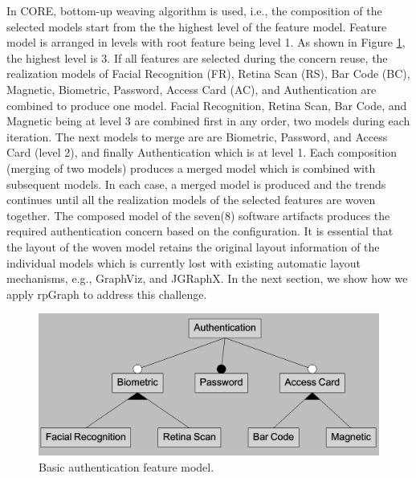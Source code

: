 In CORE, bottom-up weaving algorithm is used, i.e., the composition of the selected models start from the the highest level of the feature model. Feature model is arranged in levels with root feature being level 1. As shown in Figure \ref{fig : authentication fm}, the highest level is 3. If all features are selected during the concern reuse, the realization models of Facial Recognition (FR), Retina Scan (RS), Bar Code (BC), Magnetic, Biometric, Password, Access Card (AC), and Authentication are combined to produce one model.  Facial Recognition, Retina Scan, Bar Code, and Magnetic being at level 3 are combined first in any order, two models during each iteration.  The next models to merge are are Biometric, Password, and Access Card (level 2), and finally Authentication which is at level 1.  Each composition (merging of two models) produces a merged model which is combined with subsequent models.  In each case, a merged model is produced and the trends continues until all the realization models of the selected features are woven together. The composed model of the seven(8) software artifacts produces the required authentication concern based on the configuration. It is essential that the layout of the woven model retains the original layout information of the individual models which is currently lost with existing automatic layout mechanisms, e.g., GraphViz, and JGRaphX. In the next section, we show how we apply rpGraph to address this challenge.
  \begin{figure}
\includegraphics[width=\linewidth]{authenticationfm.PNG}
	\caption{Basic authentication feature model.}
	\label{fig : authentication fm}
\end{figure}

